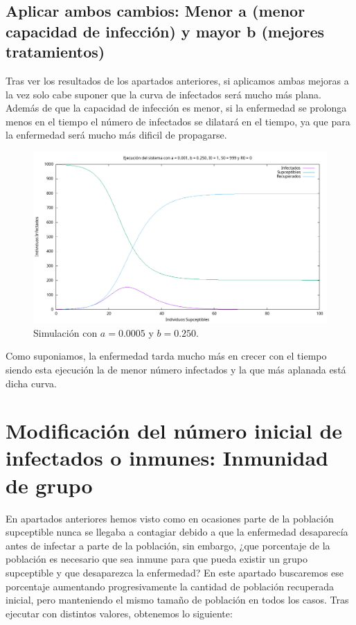 \documentclass[12pt, spanish]{article}
\begin{document}
\subsection{Aplicar ambos cambios: Menor a (menor capacidad de infección) y mayor b (mejores tratamientos)}

Tras ver los resultados de los apartados anteriores, si aplicamos ambas mejoras a la vez solo cabe suponer que la curva de infectados será mucho más plana. Además de que la capacidad de infección es menor, si la enfermedad se prolonga menos en el tiempo el número de infectados se dilatará en el tiempo, ya que para la enfermedad será mucho más dificil de propagarse.

\begin{figure}[H]
  \centering
      \includegraphics[width=\textwidth]{SIR_menor_a_mayor_b.png}
 		\caption{Simulación con $a = 0.0005$ y $b = 0.250$.}
\end{figure}

Como suponiamos, la enfermedad tarda mucho más en crecer con el tiempo siendo esta ejecución la de menor número infectados y la que más aplanada está dicha curva.


\section{Modificación del número inicial de infectados o inmunes: Inmunidad de grupo}

En apartados anteriores hemos visto como en ocasiones parte de la población supceptible nunca se llegaba a contagiar debido a que la enfermedad desaparecía antes de infectar a parte de la población, sin embargo, ¿que porcentaje de la población es necesario que sea inmune para que pueda existir un grupo supceptible y que desaparezca la enfermedad? En este apartado buscaremos ese porcentaje aumentando progresivamente la cantidad de población recuperada inicial, pero manteniendo el mismo tamaño de población en todos los casos. Tras ejecutar con distintos valores, obtenemos lo siguiente:
\end{document}

